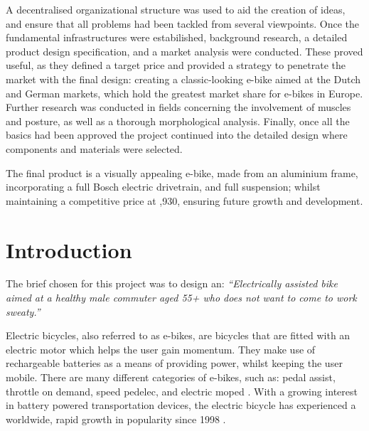 \documentclass[a4paper,11pt]{article}
\begin{document}
A decentralised organizational structure was used to aid the creation of ideas, and ensure that all problems had been tackled from several viewpoints. Once the fundamental infrastructures were estabilished, background research, a detailed product design specification, and a market analysis were conducted. These proved useful, as they defined a target price and provided a strategy to penetrate the market with the final design: creating a classic-looking e-bike aimed at the Dutch and German markets, which hold the greatest market share for e-bikes in Europe. Further research was conducted in fields concerning the involvement of muscles and posture, as well as a thorough morphological analysis. Finally, once all the basics had been approved the project continued into the detailed design where components and materials were selected. 

The final product is a visually appealing e-bike, made from an aluminium frame, incorporating a full Bosch electric drivetrain, and full suspension; whilst maintaining a competitive price at ,930, ensuring future growth and development.

\pagebreak

\begingroup
\tableofcontents
\endgroup

\pagebreak

\listoftables
{}

\pagebreak

\listoffigures
{}

\pagebreak


\section{Introduction}

The brief chosen for this project was to design an: \textit{``Electrically assisted bike aimed at a healthy male commuter aged 55+ who does not want to come to work sweaty.''}

Electric bicycles, also referred to as e-bikes, are bicycles that are fitted with an electric motor which helps the user gain momentum. They make use of rechargeable batteries as a means of providing power, whilst keeping the user mobile. There are many different categories of e-bikes, such as: pedal assist, throttle on demand, speed pedelec, and electric moped \cite{ebr}. With a growing interest in battery powered transportation devices, the electric bicycle has experienced a worldwide, rapid growth in popularity since 1998 \cite{wein07}.
\end{document}
